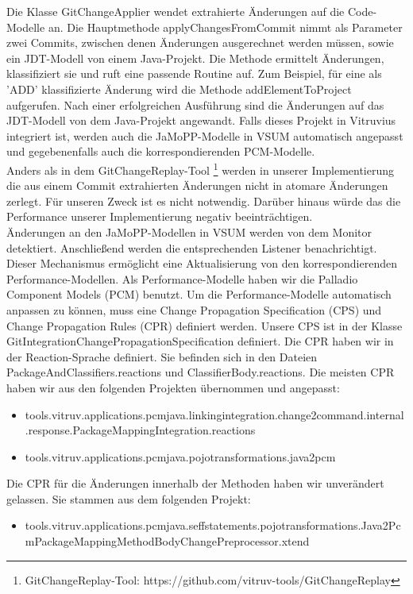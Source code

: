 Die Klasse GitChangeApplier wendet extrahierte Änderungen auf die Code-Modelle an. Die Hauptmethode applyChangesFromCommit nimmt als Parameter zwei Commits, zwischen denen Änderungen ausgerechnet werden müssen, sowie ein JDT-Modell von einem Java-Projekt. Die Methode ermittelt Änderungen, klassifiziert sie und ruft eine passende Routine auf. Zum Beispiel, für eine als 'ADD' klassifizierte Änderung wird die Methode addElementToProject aufgerufen. Nach einer erfolgreichen Ausführung sind die Änderungen auf das JDT-Modell von dem Java-Projekt angewandt. Falls dieses Projekt in Vitruvius integriert ist, werden auch die JaMoPP-Modelle in VSUM automatisch angepasst und gegebenenfalls auch die korrespondierenden PCM-Modelle.
\\ 
Anders als in dem GitChangeReplay-Tool \footnote{GitChangeReplay-Tool: https://github.com/vitruv-tools/GitChangeReplay} werden in unserer Implementierung die aus einem Commit extrahierten Änderungen nicht in atomare Änderungen zerlegt. Für unseren Zweck ist es nicht notwendig. Darüber hinaus würde das die Performance unserer Implementierung negativ beeinträchtigen.
\\
Änderungen an den JaMoPP-Modellen in VSUM werden von dem Monitor detektiert. Anschließend werden die entsprechenden Listener benachrichtigt. Dieser Mechanismus ermöglicht eine Aktualisierung von den korrespondierenden Performance-Modellen. Als Performance-Modelle haben wir die Palladio Component Models (PCM) benutzt. Um die Performance-Modelle automatisch anpassen zu können, muss eine Change Propagation Specification (CPS) und Change Propagation Rules (CPR) definiert werden. Unsere CPS ist in der Klasse GitIntegrationChangePropagationSpecification definiert. Die CPR haben wir in der Reaction-Sprache definiert. Sie befinden sich in den Dateien PackageAndClassifiers.reactions und ClassifierBody.reactions. Die meisten CPR haben wir aus den folgenden Projekten übernommen und angepasst:

\begin{itemize}
\item \begin{scriptsize}
tools.vitruv.applications.pcmjava.linkingintegration.change2command.internal.response.PackageMappingIntegration.reactions\end{scriptsize}
\item tools.vitruv.applications.pcmjava.pojotransformations.java2pcm
\end{itemize}

Die CPR für die Änderungen innerhalb der Methoden haben wir unverändert gelassen. Sie stammen aus dem folgenden Projekt:
\begin{itemize}
\item \begin{scriptsize}tools.vitruv.applications.pcmjava.seffstatements.pojotransformations.Java2PcmPackageMappingMethodBodyChangePreprocessor.xtend
\end{scriptsize}\end{itemize}

